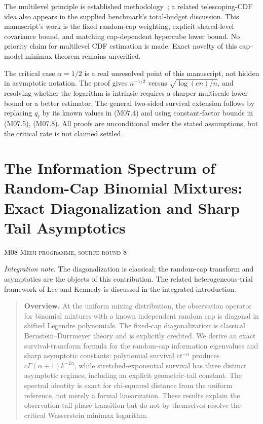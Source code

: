 \documentclass[11pt,a4paper]{article}
\theoremstyle{definition}\newtheorem{definition}[theorem]{Definition}
\theoremstyle{remark}\newtheorem{remark}[theorem]{Remark}
\numberwithin{equation}{section}
\begin{document}
The multilevel principle is established methodology~\cite{ref019,ref020}; a related telescoping-CDF idea also appears in the supplied benchmark's total-budget discussion. This manuscript's work is the fixed random-cap weighting, explicit shared-level covariance bound, and matching cap-dependent hypercube lower bound. No priority claim for multilevel CDF estimation is made. Exact novelty of this cap-model minimax theorem remains unverified.

The critical case $\alpha=1/2$ is a real unresolved point of this manuscript, not hidden in asymptotic notation. The proof gives $n^{-1/2}$ versus $\sqrt{\log(en)/n}$, and resolving whether the logarithm is intrinsic requires a sharper multiscale lower bound or a better estimator. The general two-sided survival extension follows by replacing $q_\ell$ by its known values in (M07.4) and using constant-factor bounds in (M07.5), (M07.8). All proofs are unconditional under the stated assumptions, but the critical rate is not claimed settled.





\clearpage
\section[M08 --- The Information Spectrum of Random-Cap Binomial Mixtures: Exact Diagonalization and Sharp Tail Asymptotics]{The Information Spectrum of Random-Cap Binomial Mixtures: Exact Diagonalization and Sharp Tail Asymptotics}\label{contrib-M08}
\noindent\textsc{M08 \quad Meiji programme, source round 8}\par\medskip
\noindent\textit{Integration note.} The diagonalization is classical; the random-cap transform and asymptotics are the objects of this contribution. The related heterogeneous-trial framework of Lee and Kennedy is discussed in the integrated introduction.\par\medskip


\begin{quote}\small\textbf{Overview.} At the uniform mixing distribution, the observation operator for binomial mixtures with a known independent random cap is diagonal in shifted Legendre polynomials. The fixed-cap diagonalization is classical Bernstein--Durrmeyer theory and is explicitly credited. We derive an exact survival-transform formula for the random-cap information eigenvalues and sharp asymptotic constants: polynomial survival $c t^{-\alpha}$ produces $c\Gamma(\alpha+1)k^{-2\alpha}$, while stretched-exponential survival has three distinct asymptotic regimes, including an explicit geometric-tail constant. The spectral identity is exact for chi-squared distance from the uniform reference, not merely a formal linearization. These results explain the observation-tail phase transition but do not by themselves resolve the critical Wasserstein minimax logarithm.\end{quote}
\end{document}
